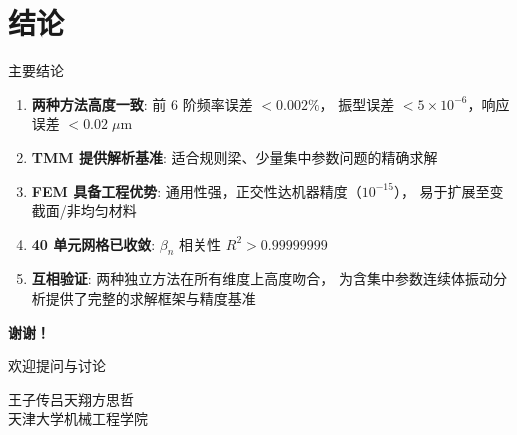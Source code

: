 \documentclass[12pt,aspectratio=169]{ctexbeamer}
\begin{document}
\section{结论}

\begin{frame}{主要结论}
  \begin{enumerate}
    \item \textbf{两种方法高度一致}: 前 6 阶频率误差 $<0.002\%$，
          振型误差 $<5\times 10^{-6}$，响应误差 $<0.02\;\mu\text{m}$

    \item \textbf{TMM 提供解析基准}: 适合规则梁、少量集中参数问题的精确求解

    \item \textbf{FEM 具备工程优势}: 通用性强，正交性达机器精度（$10^{-15}$），
          易于扩展至变截面/非均匀材料

    \item \textbf{40 单元网格已收敛}: $\beta_n$ 相关性 $R^2 > 0.99999999$

    \item \textbf{互相验证}: 两种独立方法在所有维度上高度吻合，
          为含集中参数连续体振动分析提供了完整的求解框架与精度基准
  \end{enumerate}
\end{frame}

\begin{frame}[plain]
  \centering
  \vspace{2cm}

  {\Huge \textbf{谢谢！}}

  \vspace{1.5cm}

  {\Large 欢迎提问与讨论}

  \vspace{2cm}

  {\normalsize
  王子传\quad 吕天翔\quad 方思哲\\
  天津大学\quad 机械工程学院}
\end{frame}
\end{document}
